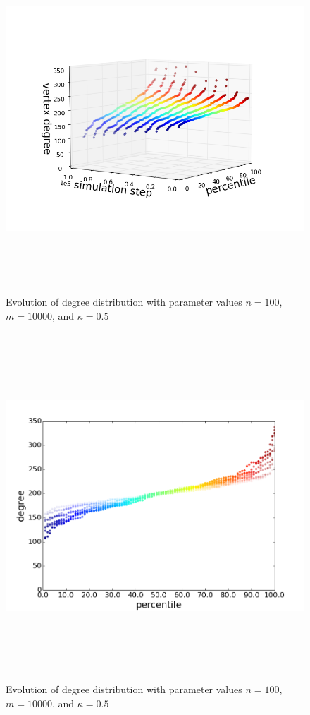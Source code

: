 \documentclass[11pt]{article}
\begin{document}
\begin{figure}[h!]
  \centering
  \includegraphics[height=130mm]{n_100_short_3d}
  \caption{Evolution of degree distribution with parameter values $n=100$, $m=10000$, and $\kappa=0.5$}
  \label{fig:100s3}
\end{figure}
\begin{figure}[h!]
  \centering
  \includegraphics[height=130mm]{n_100_short_time}
  \caption{Evolution of degree distribution with parameter values $n=100$, $m=10000$, and $\kappa=0.5$}
  \label{fig:100st}
\end{figure}
\end{document}
